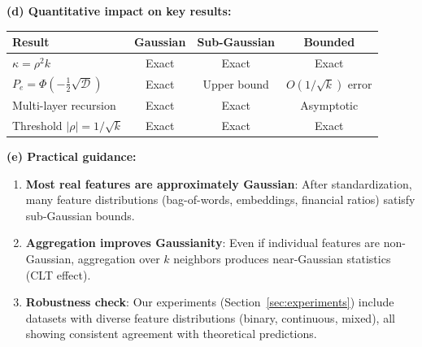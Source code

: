 \begin{remark}
\textbf{(d) Quantitative impact on key results:}
\begin{center}
\begin{tabular}{lccc}
\toprule
\textbf{Result} & \textbf{Gaussian} & \textbf{Sub-Gaussian} & \textbf{Bounded} \\
\midrule
$\kappa = \rho^2 k$ & Exact & Exact & Exact \\
$P_e = \Phi(-\frac{1}{2}\sqrt{\mathcal{D}})$ & Exact & Upper bound & $O(1/\sqrt{k})$ error \\
Multi-layer recursion & Exact & Exact & Asymptotic \\
Threshold $|\rho| = 1/\sqrt{k}$ & Exact & Exact & Exact \\
\bottomrule
\end{tabular}
\end{center}

\textbf{(e) Practical guidance:}
\begin{enumerate}
    \item \textbf{Most real features are approximately Gaussian}: After standardization, many feature distributions (bag-of-words, embeddings, financial ratios) satisfy sub-Gaussian bounds.
    \item \textbf{Aggregation improves Gaussianity}: Even if individual features are non-Gaussian, aggregation over $k$ neighbors produces near-Gaussian statistics (CLT effect).
    \item \textbf{Robustness check}: Our experiments (Section~\ref{sec:experiments}) include datasets with diverse feature distributions (binary, continuous, mixed), all showing consistent agreement with theoretical predictions.
\end{enumerate}
\end{remark}

